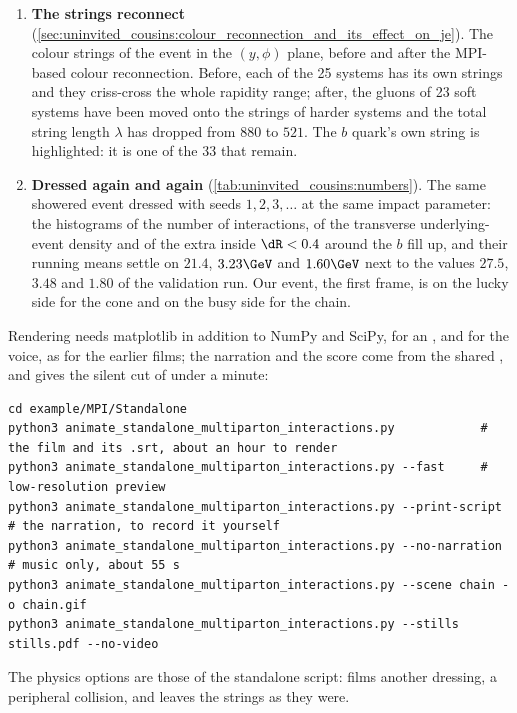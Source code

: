 \begin{enumerate}
    companion quarks for proton~A, a $ud_1$ and eight companions for
    proton~B. On the right the primordial-$k_{\mathrm{T}}$ kicks of every
    initiator and remnant are drawn as arrows; per proton they sum to zero.
  \item \textbf{The strings reconnect} (\cref{sec:uninvited_cousins:colour_reconnection_and_its_effect_on_je}).
    The colour strings of the event in the $(y,\phi)$ plane, before and
    after the MPI-based colour reconnection. Before, each of the 25 systems
    has its own strings and they criss-cross the whole rapidity range;
    after, the gluons of 23 soft systems have been moved onto the strings
    of harder systems and the total string length $\lambda$ has dropped
    from $880$ to $521$. The $b$ quark's own string is highlighted: it is
    one of the 33 that remain.
  \item \textbf{Dressed again and again} (\cref{tab:uninvited_cousins:numbers}).
    The same showered event dressed with seeds $1,2,3,\ldots$ at the same
    impact parameter: the histograms of the number of interactions, of the
    transverse underlying-event density and of the extra \pt inside
    $\dR<0.4$ around the $b$ fill up, and their running means settle on
    $21.4$, $3.23\GeV$ and $1.60\GeV$ next to the \PYTHIA values $27.5$,
    $3.48$ and $1.80$ of the validation run. Our event, the first frame, is
    on the lucky side for the cone and on the busy side for the chain.
\end{enumerate}
Rendering needs matplotlib in addition to NumPy and SciPy, 
for an , and  for the voice, as for the earlier
films; the narration and the score come from the shared
, and  gives the silent
cut of under a minute:
\begin{verbatim}
cd example/MPI/Standalone
python3 animate_standalone_multiparton_interactions.py            # the film and its .srt, about an hour to render
python3 animate_standalone_multiparton_interactions.py --fast     # low-resolution preview
python3 animate_standalone_multiparton_interactions.py --print-script   # the narration, to record it yourself
python3 animate_standalone_multiparton_interactions.py --no-narration   # music only, about 55 s
python3 animate_standalone_multiparton_interactions.py --scene chain -o chain.gif
python3 animate_standalone_multiparton_interactions.py --stills stills.pdf --no-video
\end{verbatim}
The physics options are those of the standalone script: 
films another dressing,  a peripheral collision, and
 leaves the strings as they were.

